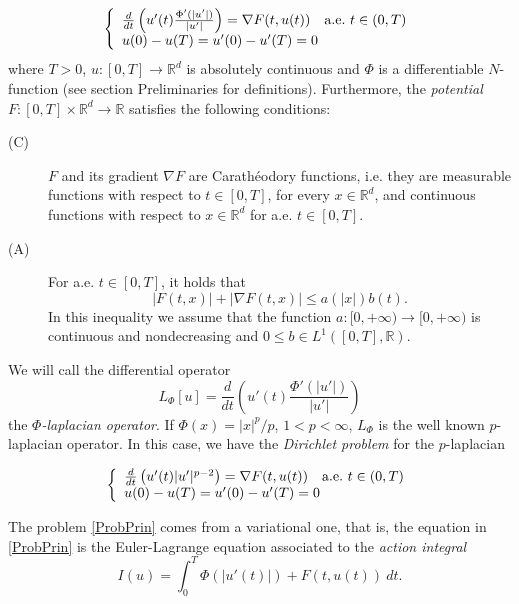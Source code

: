 \documentclass[twoside]{article}
\theoremstyle{remark}
\newcommand{\rr}{\mathbb{R}}
\renewcommand{\leq}{\leqslant}
\begin{document}
\begin{equation}\label{ProbPrin}
    \left\{%
\begin{array}{ll}
   \frac{d}{dt}\left(u'(t)\frac{\Phi'(|u'|)}{|u'|}\right) = \nabla F(t,u(t)) \quad \hbox{a.e.}\ t \in (0,T)\\
    u(0)-u(T)=u'(0)-u'(T)=0
\end{array}%
\right.
\end{equation}
where $T>0$, $u:[0,T]\to\rr^d$ is absolutely continuous and  $\Phi$ is a differentiable  $N$-function (see section Preliminaries for definitions). Furthermore, the \emph{potential} $F:[0,T]\times\rr^d\to\rr$  satisfies the following conditions:
\begin{description}

 \item[(C)]\label{item:condicion_c} $F$ and its gradient $\nabla F$ are  Carath\'eodory functions, i.e. they are measurable functions with respect to $t\in [0,T]$, for every  $x\in\rr^d$, and   continuous functions with  respect to  $x\in\rr^d$ for a.e. $t \in [0,T]$.

 \item[(A)]\label{item:condicion_a}  For   a.e. $t\in [0,T]$, it holds that
\begin{equation}
|F(t,x)| + |\nabla F(t,x)|  \leq a(|x|)b(t).
\end{equation}
In this inequality we assume that the function  $a:[0,+\infty)\to [0,+\infty)$ is continuous and nondecreasing and $0\leq b\in L^1([0,T],\rr)$.


\end{description}

We will call the differential operator
\[L_{\Phi}[u]=\frac{d}{dt}\left(u'(t)\frac{\Phi'(|u'|)}{|u'|}\right) \]
the
\emph{$\Phi$-laplacian operator}. If $\Phi(x)=|x|^p/p$, $1<p<\infty$, $L_{\Phi}$ is the well known $p$-laplacian operator. In this case, we have the \emph{Dirichlet problem} for the $p$-laplacian

\begin{equation}\label{ProbP-lapla}
    \left\{%
\begin{array}{ll}
   \frac{d}{dt}\left(u'(t)|u'|^{p-2}\right) = \nabla F(t,u(t)) \quad \hbox{a.e.}\ t \in (0,T)\\
    u(0)-u(T)=u'(0)-u'(T)=0
\end{array}%
\right.
\end{equation}



The problem \eqref{ProbPrin} comes from a variational one, that is,  the equation in  \eqref{ProbPrin}  is the Euler-Lagrange equation associated to the \emph{action integral}
\begin{equation}\label{integral_accion}
I(u)=\int_{0}^T \Phi(|u'(t)|)+F(t,u(t))\ dt.
\end{equation}
\end{document}

